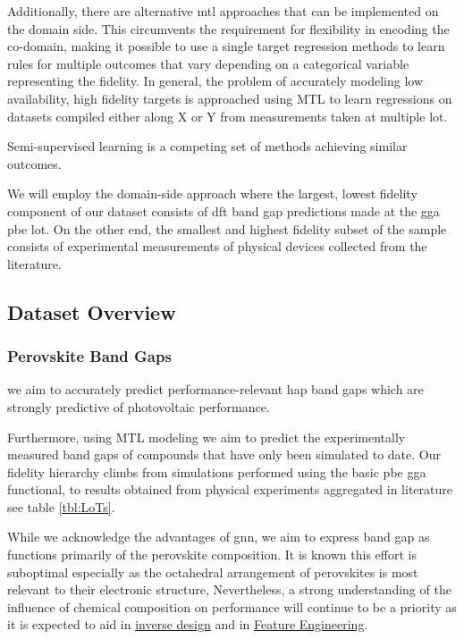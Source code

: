 \documentclass[aip, jmp, amsmath, amssymb, nofootinbib]{revtex4-2}
\begin{document}
Additionally, there are alternative \gls{mtl} approaches
that can be implemented on the domain side. This circumvents the
requirement for flexibility in encoding the co-domain, making it
possible to use a single target regression methods to learn rules for
multiple outcomes that vary depending on a categorical variable
representing the fidelity. In general, the problem of accurately
modeling low availability, high fidelity targets is approached using
MTL to learn regressions on datasets compiled either along X or Y from
measurements taken at multiple \gls{lot}.

Semi-supervised
learning\cite{chapelle-2006-semi-super-learn,lee-2013-pseud-label} is
a competing set of methods achieving similar outcomes.

We will employ the domain-side approach where the largest, lowest
fidelity component of our dataset consists of \acrfull{dft} band gap predictions made at the \acrfull{gga} \acrfull{pbe} \gls{lot}. On
the other end, the smallest and highest fidelity subset of the sample
consists of experimental measurements of physical devices collected
from the literature.

\subsection*{Dataset Overview}
\label{sec:org08a82aa}
\subsubsection*{Perovskite Band Gaps}
\label{sec:org9334c96}
we aim to accurately predict performance-relevant \Acrfull{hap} band gaps which are strongly predictive of photovoltaic
performance\cite{mannodi-kanakkithodi-2019-compr-comput}.

Furthermore, using MTL modeling we aim to predict the experimentally
measured band gaps of compounds that have only been simulated to
date. Our fidelity hierarchy climbs from  simulations performed
using the basic \acrshort{pbe} \acrshort{gga} functional, to results obtained from physical
experiments aggregated in
literature\cite{almora-2020-devic-perfor,kim-2014-cdses-nanow,swanson-2017-co-sublim}
see table \ref{tbl:LoTs}.

While we acknowledge the advantages of \acrshort{gnn}, we aim to express band
gap as functions primarily of the perovskite composition. It is known
this effort is suboptimal especially as the octahedral arrangement of
perovskites is most relevant to their electronic structure,
Nevertheless, a strong understanding of the influence of chemical
composition on performance will continue to be a priority as it is
expected to aid in \hyperref[sec:org007fe94]{inverse design} and in \hyperref[sec:orge549945]{Feature Engineering}.
\end{document}
